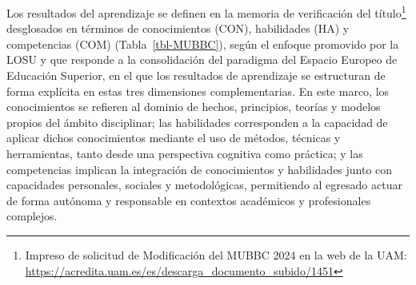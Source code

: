 \documentclass[
  11pt,
  a4paper,
  twoside]{scrreprt}
\begin{document}
Los resultados del aprendizaje se definen en la memoria de verificación
del título\footnote{Impreso de solicitud de Modificación del MUBBC 2024
  en la web de la UAM:
  \url{https://acredita.uam.es/es/descarga_documento_subido/1451}}
desglosados en términos de conocimientos (CON), habilidades (HA) y
competencias (COM) (Tabla~\ref{tbl-MUBBC}), según el enfoque promovido
por la LOSU y que responde a la consolidación del paradigma del Espacio
Europeo de Educación Superior, en el que los resultados de aprendizaje
se estructuran de forma explícita en estas tres dimensiones
complementarias. En este marco, los conocimientos se refieren al dominio
de hechos, principios, teorías y modelos propios del ámbito disciplinar;
las habilidades corresponden a la capacidad de aplicar dichos
conocimientos mediante el uso de métodos, técnicas y herramientas, tanto
desde una perspectiva cognitiva como práctica; y las competencias
implican la integración de conocimientos y habilidades junto con
capacidades personales, sociales y metodológicas, permitiendo al
egresado actuar de forma autónoma y responsable en contextos académicos
y profesionales complejos.

\clearpage
\end{document}
